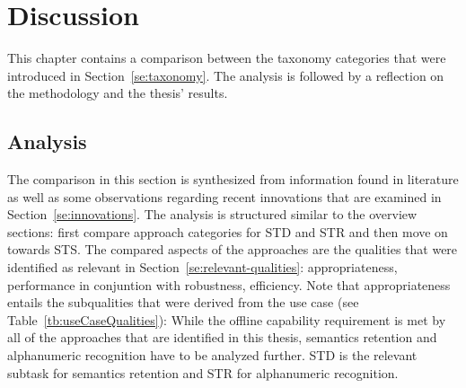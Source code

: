 \chapter{Discussion}\label{ch:discussion}
This chapter contains a comparison between the taxonomy categories that were introduced in
Section~\ref{se:taxonomy}.
The analysis is followed by a reflection on the methodology and the thesis' results.

\section{Analysis}\label{se:analysis}
The comparison in this section is synthesized from information found in literature as well as
some observations regarding recent innovations that are examined in Section~\ref{se:innovations}.
The analysis is structured similar to the overview sections: first compare approach categories
for \ac{STD} and \ac{STR} and then move on towards \ac{STS}.
The compared aspects of the approaches are the qualities that were identified as relevant in
Section~\ref{se:relevant-qualities}: appropriateness, performance in conjuntion with robustness,
efficiency.
Note that appropriateness entails the subqualities that were derived from the use
case (see Table~\ref{tb:useCaseQualities}):
While the offline capability requirement is met by all of the approaches that are identified in this
thesis, semantics retention and alphanumeric recognition have to be analyzed further.
\ac{STD} is the relevant subtask for semantics retention and \ac{STR} for alphanumeric recognition.

